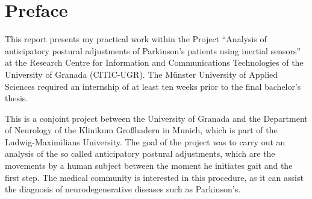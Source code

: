\chapter*{Preface}

This report presents my practical work within the Project ``Analysis of anticipatory postural adjustments of Parkinson's patients using inertial sensors'' at the Research Centre for Information and Communications Technologies of the University of Granada (CITIC-UGR). The Münster University of Applied Sciences required an internship of at least ten weeks prior to the final bachelor's thesis.

This is a conjoint project between the University of Granada and the Department of Neurology of the Klinikum Großhadern in Munich, which is part of the Ludwig-Maximilians University. The goal of the project was to carry out an analysis of the so called anticipatory postural adjustments, which are the movements by a human subject between the moment he initiates gait and the first step. The medical community is interested in this procedure, as it can assist the diagnosis of neurodegenerative diseases such as Parkinson's.
